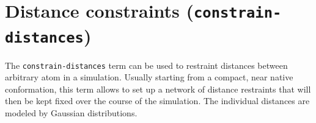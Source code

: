 
\section{Distance constraints (\texttt{constrain-distances})}
\label{sec:constr-dist-term}

The \texttt{constrain-distances} term can be used to restraint
distances between arbitrary atom in a simulation. Usually starting
from a compact, near native conformation, this term allows to set up a
network of distance restraints that will then be kept fixed over the
course of the simulation. The individual distances are modeled by
Gaussian distributions.




